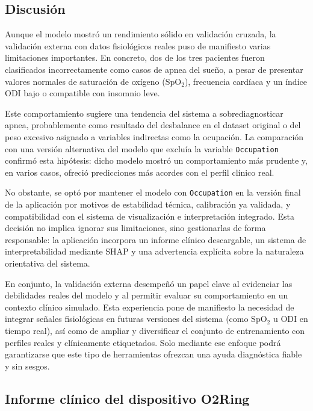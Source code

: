 \subsection{Discusión}

Aunque el modelo mostró un rendimiento sólido en validación cruzada, la validación externa con datos fisiológicos reales puso de manifiesto varias limitaciones importantes. En concreto, dos de los tres pacientes fueron clasificados incorrectamente como casos de apnea del sueño, a pesar de presentar valores normales de saturación de oxígeno (SpO$_2$), frecuencia cardíaca y un índice ODI bajo o compatible con insomnio leve.

Este comportamiento sugiere una tendencia del sistema a sobrediagnosticar apnea, probablemente como resultado del desbalance en el dataset original o del peso excesivo asignado a variables indirectas como la ocupación. La comparación con una versión alternativa del modelo que excluía la variable \texttt{Occupation} confirmó esta hipótesis: dicho modelo mostró un comportamiento más prudente y, en varios casos, ofreció predicciones más acordes con el perfil clínico real.

No obstante, se optó por mantener el modelo con \texttt{Occupation} en la versión final de la aplicación por motivos de estabilidad técnica, calibración ya validada, y compatibilidad con el sistema de visualización e interpretación integrado. Esta decisión no implica ignorar sus limitaciones, sino gestionarlas de forma responsable: la aplicación incorpora un informe clínico descargable, un sistema de interpretabilidad mediante SHAP y una advertencia explícita sobre la naturaleza orientativa del sistema.

En conjunto, la validación externa desempeñó un papel clave al evidenciar las debilidades reales del modelo y al permitir evaluar su comportamiento en un contexto clínico simulado. Esta experiencia pone de manifiesto la necesidad de integrar señales fisiológicas en futuras versiones del sistema (como SpO$_2$ u ODI en tiempo real), así como de ampliar y diversificar el conjunto de entrenamiento con perfiles reales y clínicamente etiquetados. Solo mediante ese enfoque podrá garantizarse que este tipo de herramientas ofrezcan una ayuda diagnóstica fiable y sin sesgos.



\subsection{Informe clínico del dispositivo O2Ring}

